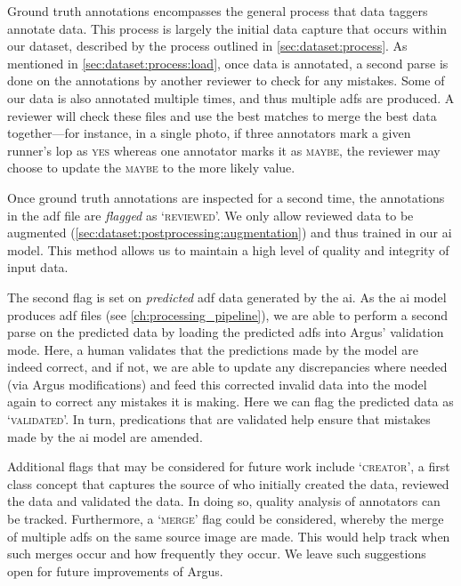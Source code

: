 Ground truth annotations encompasses the general process that data taggers annotate data. This process is largely the initial data capture that occurs within our dataset, described by the process outlined in \cref{sec:dataset:process}. As mentioned in \cref{sec:dataset:process:load}, once data is annotated, a second parse is done on the annotations by another reviewer to check for any mistakes. Some of our data is also annotated multiple times, and thus multiple \glspl{adf} are produced. A reviewer will check these files and use the best matches to merge the best data together---for instance, in a single photo, if three annotators mark a given runner's \gls{lop} as \textsc{yes} whereas one annotator marks it as \textsc{maybe}, the reviewer may choose to update the \textsc{maybe} to the more likely value.

Once ground truth annotations are inspected for a second time, the annotations in the \gls{adf} file are \textit{flagged} as `\textsc{reviewed}'. We only allow reviewed data to be augmented (\cref{sec:dataset:postprocessing:augmentation}) and thus trained in our \gls{ai} model. This method allows us to maintain a high level of quality and integrity of input data.

The second flag is set on \textit{predicted} \gls{adf} data generated by the \gls{ai}. As the \gls{ai} model produces \gls{adf} files (see \cref{ch:processing_pipeline}), we are able to perform a second parse on the predicted data by loading the predicted \glspl{adf} into Argus' validation mode. Here, a human validates that the predictions made by the model are indeed correct, and if not, we are able to update any discrepancies where needed (via Argus modifications) and feed this corrected invalid data into the model again to correct any mistakes it is making. Here we can flag the predicted data as `\textsc{validated}'. In turn, predications that are validated help ensure that mistakes made by the \gls{ai} model are amended. 

Additional flags that may be considered for future work include `\textsc{creator}', a first class concept that captures the source of who initially created the data, reviewed the data and validated the data. In doing so, quality analysis of annotators can be tracked. Furthermore, a `\textsc{merge}' flag could be considered, whereby the merge of multiple \glspl{adf} on the same source image are made. This would help track when such merges occur and how frequently they occur. We leave such suggestions open for future improvements of Argus.


